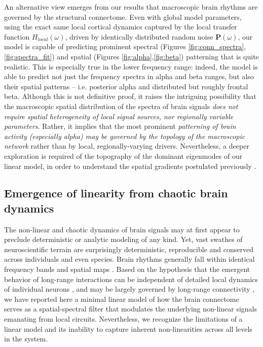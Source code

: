 An alternative view emerges from our results that macroscopic brain
rhythms are governed by the structural connectome. Even with global
model parameters, using the exact same local cortical dynamics captured
by the local transfer function $H_{local}(\omega)$, driven by
identically distributed random noise $\mathbf{P}(\omega)$, our model
is capable of predicting prominent spectral (Figures \ref{fig:conn_spectra}, \ref{fig:spectra_fit}) and spatial
(Figures \ref{fig:alpha},\ref{fig:beta}) patterning that is quite realistic. This is especially
true in the lower frequency range: indeed, the model is able to predict
not just the frequency spectra in alpha and beta ranges, but also their
spatial patterns -- i.e. posterior alpha and distributed but roughly
frontal beta. Although this is not definitive proof, it raises the
intriguing possibility that the macroscopic spatial distribution of the
spectra of brain signals \emph{does not require spatial
heterogeneity of local signal sources, nor regionally variable
parameters}. Rather, it implies that the most prominent
\emph{patterning of brain activity (especially alpha) may be
governed by the topology of the macroscopic network} rather than by
local, regionally-varying drivers. Nevertheless, a deeper exploration is
required of the topography of the dominant eigenmodes of our linear
model, in order to understand the spatial gradients postulated
previously \cite{robinson_multiscale_2005,vijayan_thalamocortical_2013}.

\subsection{Emergence of linearity from chaotic brain dynamics}

The non-linear and chaotic dynamics of brain signals may at first appear
to preclude deterministic or analytic modeling of any kind. Yet, vast
swathes of neuroscientific terrain are surprisingly deterministic,
reproducible and conserved across individuals and even species. Brain
rhythms generally fall within identical frequency bands and spatial maps
\cite{freeman_simulated_2009,robinson_multiscale_2005,he_temporal_2010}. Based on the hypothesis that the emergent
behavior of long-range interactions can be independent of detailed local
dynamics of individual neurons \cite{shimizu_co-operative_1983,misic_communication_2014,misic_cooperative_2015,destexhe_wilson-cowan_2009,abdelnour_network_2014}, and may be
largely governed by long-range connectivity \cite{abdelnour_estimating_2015,Nakagawa2014,jirsa_spatiotemporal_2002,Deco2012}, we
have reported here a minimal linear model of how the brain connectome
serves as a spatial-spectral filter that modulates the underlying
non-linear signals emanating from local circuits. Nevertheless, we
recognize the limitations of a linear model and its inability to capture
inherent non-linearities across all levels in the system.

